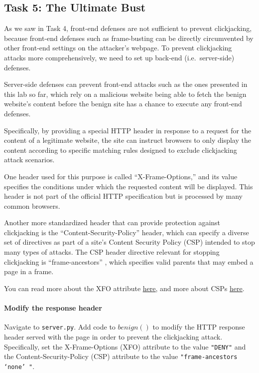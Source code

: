 
\subsection{Task 5: The Ultimate Bust}
As we saw in Task 4, front-end defenses are not sufficient to prevent
clickjacking, because front-end defenses such as frame-busting can be
directly circumvented by other front-end settings on the attacker's
webpage. To prevent clickjacking attacks more comprehensively, we need
to set up back-end (i.e.\ server-side) defenses.

Server-side defenses can prevent front-end attacks such as the ones
presented in this lab so far, which rely on a malicious website being
able to fetch the benign website's content before the benign site has a
chance to execute any front-end defenses. 

Specifically, by providing a special HTTP header in response to a
request for the content of a legitimate website, the site can instruct
browsers to only display the content according to specific matching
rules designed to exclude clickjacking attack scenarios.

One header used for this purpose is called ``X-Frame-Options,'' and its
value specifies the conditions under which the requested content will be
displayed.  This header is not part of the official HTTP specification
but is processed by many common browsers.

Another more standardized header that can provide protection against
clickjacking is the ``Content-Security-Policy'' header, which can
specify a diverse set of directives as part of a site's Content Security
Policy (CSP) intended to stop many types of attacks.  The CSP header
directive relevant for stopping clickjacking is ``frame-ancestors'' ,
which specifies valid parents that may embed a page in a frame.

You can read more about the XFO attribute
\underline{\href{https://developer.mozilla.org/en-US/docs/Web/HTTP/Headers/X-Frame-Options}{here}},
and more about CSPs
\underline{\href{https://developer.mozilla.org/en-US/docs/Web/HTTP/CSP}{here}}.

\paragraph{Modify the response header} Navigate to \texttt{server.py}.
Add code to $benign()$ to modify the HTTP response header served with
the page in order to prevent the clickjacking attack.  Specifically, set
the X-Frame-Options (XFO) attribute to the value \texttt{"DENY"} and the
Content-Security-Policy (CSP) attribute to the value
\texttt{"frame-ancestors `none' "}.


